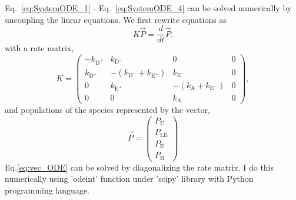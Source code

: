 \documentclass[../talant.diss.submit.tex]{subfiles}
\begin{document}
Eq.~\ref{eq:SystemODE_1} - Eq.~\ref{eq:SystemODE_4} can be solved numerically by uncoupling the
linear equations. We first rewrite equations as 
%
%
\begin{equation}
  \label{eq:vec_ODE}
  K \vec{P}  = \frac{d}{dt} \vec{P}.
\end{equation}                                                                                           
with a rate matrix,
\begin{equation}
  \label{eq:rate_mat}
  K =                                                                                                 
  \left(\begin{array}{cccc}                                                                            
    -k_{\mathrm{D}^{+}}  & k_{\mathrm{D}^{-}}  &  0 & 0  \\                                                                
    k_{\mathrm{D}^{+}} &  -(k_{\mathrm{D}^{-}} + k_{\mathrm{E}^{+}})  & k_{\mathrm{E}^{-}}  & 0   \\             
    0 & k_{\mathrm{E}^{+}}  &  -(k_{\mathrm{A}} + k_{\mathrm{E}^{-}})  & 0  \\
    0  &  0  &  k_{\mathrm{A}}  &  0
  \end{array}\right),
\end{equation}
and populations of the species represented by the vector, 
\begin{equation}
  \label{eq:pop_vec}                                                                                       
  \vec{P} =                                                                                                 
  \left(\begin{array}{c}                                                                            
    P_{\mathrm{U}}\\                                                                
    P_{\mathrm{LE}} \\             
    P_{\mathrm{E}}  \\
    P_{\mathrm{B}}      
  \end{array}\right)                                                                                        
\end{equation}                                                                                               
Eq.\ref{eq:vec_ODE} can be solved by diagonalizing the rate matrix. I do this numerically
using 'odeint' function under 'scipy' library with Python programming language.
\end{document}
